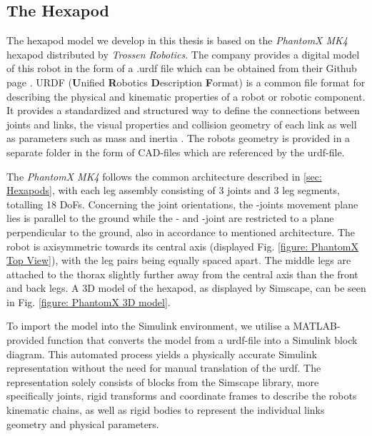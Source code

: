 \subsection{The Hexapod}
The hexapod model we develop in this thesis is based on the \textit{PhantomX MK4} hexapod distributed by \textit{Trossen Robotics}.
The company provides a digital model of this robot in the form of a .urdf file which can be obtained from their Github page \parencite{interboticsGithub}.
URDF (\textbf{U}nified \textbf{R}obotics \textbf{D}escription \textbf{F}ormat) is a common file format for describing the physical and kinematic properties of a robot or robotic component.
It provides a standardized and structured way to define the connections between joints and links, the visual properties and collision geometry of each link as well as parameters such as mass and inertia \parencite{matlabURDFDocumentation}.
The robots geometry is provided in a separate folder in the form of CAD-files which are referenced by the urdf-file.

The \textit{PhantomX MK4} follows the common architecture described in \ref{sec: Hexapods}, with each leg assembly consisting of 3 joints and 3 leg segments, totalling 18 DoFs.
Concerning the joint orientations, the \textalpha-joints movement plane lies is parallel to the ground while the \textbeta- and \textgamma-joint are restricted to a plane perpendicular to the ground, also in accordance to mentioned architecture.
The robot is axisymmetric towards its central axis (displayed Fig. \ref{figure: PhantomX Top View}), with the leg pairs being equally spaced apart.
The middle legs are attached to the thorax slightly further away from the central axis than the front and back legs.
A 3D model of the hexapod, as displayed by Simscape, can be seen in Fig. \ref{figure: PhantomX 3D model}.

To import the model into the Simulink environment, we utilise a MATLAB-provided function that converts the model from a urdf-file into a Simulink block diagram.
This automated process yields a physically accurate Simulink representation without the need for manual translation of the urdf.
The representation solely consists of blocks from the Simscape library, more specifically joints, rigid transforms and coordinate frames to describe the robots kinematic chains, as well as rigid bodies to represent the individual links geometry and physical parameters.

